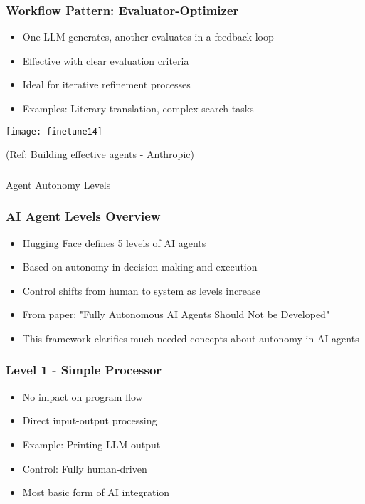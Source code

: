 \begin{frame}[fragile]\frametitle{Workflow Pattern: Evaluator-Optimizer}
\begin{itemize}
    \item One LLM generates, another evaluates in a feedback loop
    \item Effective with clear evaluation criteria
    \item Ideal for iterative refinement processes
    \item Examples: Literary translation, complex search tasks
\end{itemize}

\begin{center}
\texttt{[image: finetune14]}
\end{center}

{\tiny (Ref: Building effective agents - Anthropic)}
\end{frame}

\begin{frame}[fragile]\frametitle{}
\begin{center}
{\Large Agent Autonomy Levels}
\end{center}
\end{frame}

\begin{frame}[fragile]\frametitle{AI Agent Levels Overview}
\begin{itemize}
    \item Hugging Face defines 5 levels of AI agents
    \item Based on autonomy in decision-making and execution
    \item Control shifts from human to system as levels increase
    \item From paper: "Fully Autonomous AI Agents Should Not be Developed"
    \item This framework clarifies much-needed concepts about autonomy in AI agents
\end{itemize}
\end{frame}

\begin{frame}[fragile]\frametitle{Level 1 - Simple Processor}
\begin{itemize}
    \item No impact on program flow
    \item Direct input-output processing
    \item Example: Printing LLM output
    \item Control: Fully human-driven
    \item Most basic form of AI integration
\end{itemize}
\end{frame}

